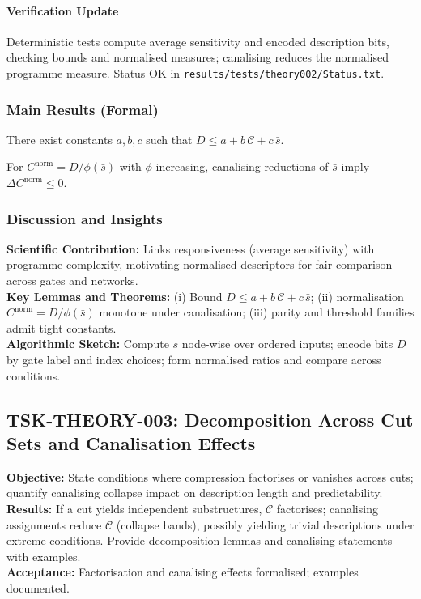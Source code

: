 \documentclass{article}
\begin{document}
\paragraph{Verification Update} Deterministic tests compute average sensitivity and encoded description bits, checking bounds and normalised measures; canalising reduces the normalised programme measure. Status OK in \texttt{results/tests/theory002/Status.txt}.
\subsubsection*{Main Results (Formal)}
\begin{theorem}
There exist constants \(a,b,c\) such that \(D \le a + b\,\mathcal{C} + c\,\bar{s}\).
\end{theorem}
\begin{lemma}
For \(C^{\mathrm{norm}}=D/\phi(\bar{s})\) with \(\phi\) increasing, canalising reductions of \(\bar{s}\) imply \(\Delta C^{\mathrm{norm}}\le 0\).
\end{lemma}
\subsubsection*{Discussion and Insights}
\textbf{Scientific Contribution:} Links responsiveness (average sensitivity) with programme complexity, motivating normalised descriptors for fair comparison across gates and networks.\\
\textbf{Key Lemmas and Theorems:} (i) Bound \(D \le a + b\,\mathcal{C} + c\,\bar{s}\); (ii) normalisation \(C^{\mathrm{norm}}=D/\phi(\bar{s})\) monotone under canalisation; (iii) parity and threshold families admit tight constants.\\
\textbf{Algorithmic Sketch:} Compute \(\bar{s}\) node-wise over ordered inputs; encode bits \(D\) by gate label and index choices; form normalised ratios and compare across conditions.

\subsection{TSK-THEORY-003: Decomposition Across Cut Sets and Canalisation Effects}
\textbf{Objective:} State conditions where compression factorises or vanishes across cuts; quantify canalising collapse impact on description length and predictability.\\
\textbf{Results:} If a cut yields independent substructures, \(\mathcal{C}\) factorises; canalising assignments reduce \(\mathcal{C}\) (collapse bands), possibly yielding trivial descriptions under extreme conditions. Provide decomposition lemmas and canalising statements with examples.\\
\textbf{Acceptance:} Factorisation and canalising effects formalised; examples documented.\
\end{document}
